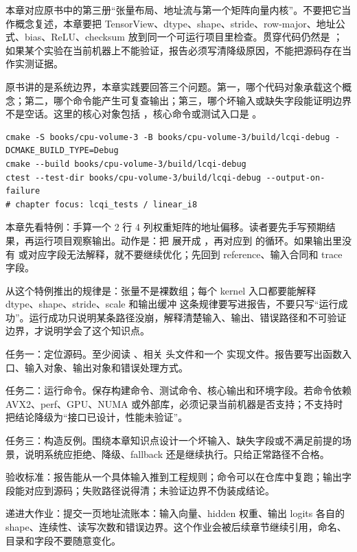 
本章对应原书中的第三册“张量布局、地址流与第一个矩阵向量内核”。不要把它当作概念复述，本章要把 TensorView、dtype、shape、stride、row-major、地址公式、bias、ReLU、checksum 放到同一个可运行项目里检查。贯穿代码仍然是 ；如果某个实验在当前机器上不能验证，报告必须写清降级原因，不能把源码存在当作实测证据。


原书讲的是系统边界，本章实践要回答三个问题。第一，哪个代码对象承载这个概念；第二，哪个命令能产生可复查输出；第三，哪个坏输入或缺失字段能证明边界不是空话。这里的核心对象包括 ，核心命令或测试入口是 。

\begin{lstlisting}[numbers=none,caption={第 2 章实践：张量布局、地址流与第一个 MatVec 的最小命令入口}]
cmake -S books/cpu-volume-3 -B books/cpu-volume-3/build/lcqi-debug -DCMAKE_BUILD_TYPE=Debug
cmake --build books/cpu-volume-3/build/lcqi-debug
ctest --test-dir books/cpu-volume-3/build/lcqi-debug --output-on-failure
# chapter focus: lcqi_tests / linear_i8
\end{lstlisting}


本章先看特例：手算一个 2 行 4 列权重矩阵的地址偏移。读者要先手写预期结果，再运行项目观察输出。动作是：把  展开成 ，再对应到  的循环。如果输出里没有  或对应字段无法解释，就不要继续优化；先回到 reference、输入合同和 trace 字段。

从这个特例推出的规律是：张量不是裸数组；每个 kernel 入口都要能解释 dtype、shape、stride、scale 和输出缓冲 这条规律要写进报告，不要只写“运行成功”。运行成功只说明某条路径没崩，解释清楚输入、输出、错误路径和不可验证边界，才说明学会了这个知识点。


任务一：定位源码。至少阅读 、相关  头文件和一个  实现文件。报告要写出函数入口、输入对象、输出对象和错误处理方式。

任务二：运行命令。保存构建命令、测试命令、核心输出和环境字段。若命令依赖 AVX2、perf、GPU、NUMA 或外部库，必须记录当前机器是否支持；不支持时把结论降级为“接口已设计，性能未验证”。

任务三：构造反例。围绕本章知识点设计一个坏输入、缺失字段或不满足前提的场景，说明系统应拒绝、降级、fallback 还是继续执行。只给正常路径不合格。


验收标准：报告能从一个具体输入推到工程规则；命令可以在仓库中复跑；输出字段能对应到源码；失败路径说得清；未验证边界不伪装成结论。

递进大作业：提交一页地址流账本：输入向量、hidden 权重、输出 logits 各自的 shape、连续性、读写次数和错误边界。这个作业会被后续章节继续引用，命名、目录和字段不要随意变化。
